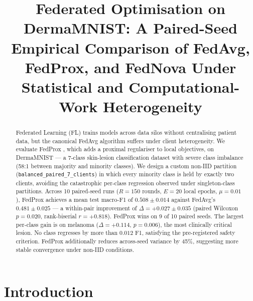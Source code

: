 \documentclass[11pt,a4paper]{article}
\title{Federated Optimisation on DermaMNIST: A Paired-Seed Empirical
Comparison of FedAvg, FedProx, and FedNova Under Statistical and
Computational-Work Heterogeneity}
\author{}
\date{}
\begin{document}
\maketitle

\begin{abstract}
Federated Learning (FL) trains models across data silos without
centralising patient data, but the canonical FedAvg algorithm
\citep{mcmahan2017fedavg} suffers under client heterogeneity. We
evaluate FedProx \citep{li2020fedprox}, which adds a proximal
regulariser to local objectives, on DermaMNIST --- a 7-class
skin-lesion classification dataset with severe class imbalance
(58:1 between majority and minority classes). We design a custom
non-IID partition (\texttt{balanced\_paired\_7\_clients}) in which
every minority class is held by exactly two clients, avoiding the
catastrophic per-class regression observed under singleton-class
partitions. Across 10 paired-seed runs ($R = 150$ rounds, $E = 20$
local epochs, $\mu = 0.01$), FedProx achieves a mean test macro-F1
of $0.508 \pm 0.014$ against FedAvg's $0.481 \pm 0.025$ --- a
within-pair improvement of $\Delta = +0.027 \pm 0.035$ (paired
Wilcoxon $p = 0.020$, rank-biserial $r = +0.818$). FedProx wins on
9 of 10 paired seeds. The largest per-class gain is on melanoma
($\Delta = +0.114$, $p = 0.006$), the most clinically critical
lesion. No class regresses by more than $0.012$ F1, satisfying the
pre-registered safety criterion. FedProx additionally reduces
across-seed variance by 45\%, suggesting more stable convergence
under non-IID conditions.
\end{abstract}

\tableofcontents
\newpage
\listoffigures
\newpage
\listoftables
\newpage

\section{Introduction}\label{sec:intro}
\end{document}
